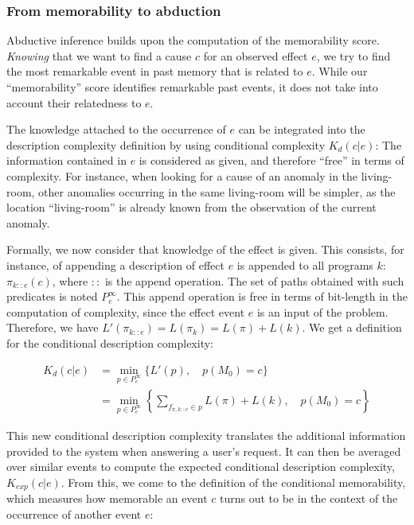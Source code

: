 \documentclass[entropy,article,submit,moreauthors,pdftex]{Definitions/mdpi}
\begin{document}
\subsubsection{From memorability to abduction}
Abductive inference builds upon the computation
of the memorability score. \emph{Knowing} that we want to find a cause $c$
for an observed effect $e$, we try to find the most remarkable event in past
memory that is related to $e$. While our ``memorability'' score identifies remarkable past events, it does not take into account their relatedness to $e$.

The knowledge attached to the occurrence of $e$ can be integrated into the description complexity definition by using conditional complexity $K_d(c | e)$: The information contained in $e$ is considered as given, and therefore ``free'' in terms of complexity. For instance, when looking for a cause of
an anomaly in the living-room, other anomalies occurring in the same
living-room will be simpler, as the location ``living-room'' is already known
from the observation of the current anomaly.

Formally, we now consider that knowledge of the effect is given. This consists, for instance, of appending a description of effect $e$  is appended to all programs $k$:
$\pi_{k::e}(c)$, where $::$ is the append operation. The set of paths obtained with such predicates is noted $P^\infty_e$. This append operation is free in terms of bit-length in the computation of complexity, since the effect event $e$ is an input of the problem. Therefore, we have $L'(\pi_{k::e}) = L(\pi_k) = L(\pi) + L(k)$. We get a definition for the conditional description complexity:

\begin{align}
    \label{eq:abd_k}
    K_d(c | e) & = \min_{p \in P^\infty_e} \{L'(p), \quad p(M_0)=c \}                                                \\
               & = \min_{p \in P^\infty_e} \left\{\sum_{f_{\pi, k::e} \in p} L(\pi) + L(k), \quad p(M_0) = c\right\}
\end{align}

This new conditional description complexity translates the additional information provided to the
system when answering a user's request. It can then be averaged over similar events to compute the expected conditional description complexity, $K_{exp}(c|e)$. From this, we come to the definition of the conditional memorability, which measures how memorable an event $c$ turns out to be in the context of the occurrence of another event $e$:
\end{document}
